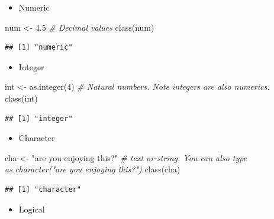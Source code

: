 \documentclass[
]{book}
\newenvironment{Shaded}{\begin{snugshade}}{\end{snugshade}}
\newcommand{\CommentTok}[1]{\textcolor[rgb]{0.56,0.35,0.01}{\textit{#1}}}
\newcommand{\DecValTok}[1]{\textcolor[rgb]{0.00,0.00,0.81}{#1}}
\newcommand{\FloatTok}[1]{\textcolor[rgb]{0.00,0.00,0.81}{#1}}
\newcommand{\FunctionTok}[1]{\textcolor[rgb]{0.00,0.00,0.00}{#1}}
\newcommand{\NormalTok}[1]{#1}
\newcommand{\OtherTok}[1]{\textcolor[rgb]{0.56,0.35,0.01}{#1}}
\newcommand{\StringTok}[1]{\textcolor[rgb]{0.31,0.60,0.02}{#1}}
\providecommand{\tightlist}{%
  \setlength{\itemsep}{0pt}\setlength{\parskip}{0pt}}
\begin{document}
\begin{itemize}
\tightlist
\item
  Numeric
\end{itemize}

\begin{Shaded}
\begin{Highlighting}[]
\NormalTok{num }\OtherTok{\textless{}{-}} \FloatTok{4.5} \CommentTok{\# Decimal values}
\FunctionTok{class}\NormalTok{(num)}
\end{Highlighting}
\end{Shaded}

\begin{verbatim}
## [1] "numeric"
\end{verbatim}

\begin{itemize}
\tightlist
\item
  Integer
\end{itemize}

\begin{Shaded}
\begin{Highlighting}[]
\NormalTok{int }\OtherTok{\textless{}{-}} \FunctionTok{as.integer}\NormalTok{(}\DecValTok{4}\NormalTok{) }\CommentTok{\# Natural numbers. Note integers are also numerics.}
\FunctionTok{class}\NormalTok{(int)}
\end{Highlighting}
\end{Shaded}

\begin{verbatim}
## [1] "integer"
\end{verbatim}

\begin{itemize}
\tightlist
\item
  Character
\end{itemize}

\begin{Shaded}
\begin{Highlighting}[]
\NormalTok{cha }\OtherTok{\textless{}{-}} \StringTok{"are you enjoying this?"} \CommentTok{\# text or string. You can also type \textasciigrave{}as.character("are you enjoying this?")\textasciigrave{}}
\FunctionTok{class}\NormalTok{(cha)}
\end{Highlighting}
\end{Shaded}

\begin{verbatim}
## [1] "character"
\end{verbatim}

\begin{itemize}
\tightlist
\item
  Logical
\end{itemize}
\end{document}
